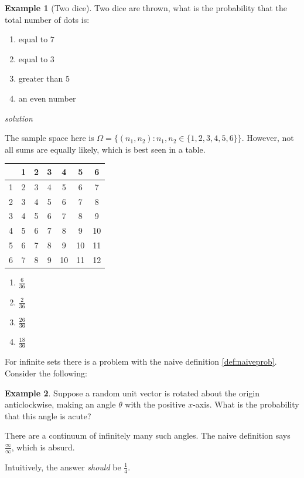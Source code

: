 \documentclass[
]{book}
\providecommand{\tightlist}{%
  \setlength{\itemsep}{0pt}\setlength{\parskip}{0pt}}
\theoremstyle{definition}
\theoremstyle{definition}
\newtheorem{example}{Example}[chapter]
\theoremstyle{definition}
\theoremstyle{definition}
\theoremstyle{remark}
\begin{document}
\begin{example}[Two dice]

Two dice are thrown, what is the probability that the total number of dots is:

\begin{enumerate}
\def\labelenumi{\alph{enumi})}
\tightlist
\item
  equal to \(7\)
\item
  equal to \(3\)
\item
  greater than \(5\)
\item
  an even number
\end{enumerate}

\emph{solution}

The sample space here is \(\Omega = \{ (n_1,n_2) : n_1 , n_2 \in \{1,2,3,4,5,6 \} \}\). However, not all sums are equally likely, which is best seen in a table.

\begin{longtable}[]{@{}ccccccc@{}}
\toprule
& 1 & 2 & 3 & 4 & 5 & 6\tabularnewline
\midrule
\endhead
1 & 2 & 3 & 4 & 5 & 6 & 7\tabularnewline
2 & 3 & 4 & 5 & 6 & 7 & 8\tabularnewline
3 & 4 & 5 & 6 & 7 & 8 & 9\tabularnewline
4 & 5 & 6 & 7 & 8 & 9 & 10\tabularnewline
5 & 6 & 7 & 8 & 9 & 10 & 11\tabularnewline
6 & 7 & 8 & 9 & 10 & 11 & 12\tabularnewline
\bottomrule
\end{longtable}

\begin{enumerate}
\def\labelenumi{\alph{enumi})}
\tightlist
\item
  \(\frac{6}{36}\)
\item
  \(\frac{2}{36}\)
\item
  \(\frac{26}{36}\)
\item
  \(\frac{18}{36}\)
\end{enumerate}

\end{example}

For infinite sets there is a problem with the naive definition \ref{def:naiveprob}. Consider the following:

\begin{example}
\protect\hypertarget{exm:randangle}{}\label{exm:randangle}Suppose a random unit vector is rotated about the origin anticlockwise, making an angle \(\theta\) with the positive \(x\)-axis. What is the probability that this angle is acute?

There are a continuum of infinitely many such angles. The naive definition says \(\frac{\infty}{\infty}\), which is absurd.

Intuitively, the answer \emph{should} be \(\frac{1}{4}\).
\end{example}
\end{document}
